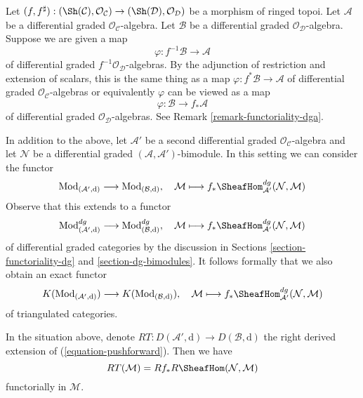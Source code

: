 \medskip\noindent
Let $(f, f^\sharp) : (\Sh(\mathcal{C}), \mathcal{O}_\mathcal{C})
\to (\Sh(\mathcal{D}), \mathcal{O}_\mathcal{D})$
be a morphism of ringed topoi. Let $\mathcal{A}$ be a differential
graded $\mathcal{O}_\mathcal{C}$-algebra. Let $\mathcal{B}$ be a
differential graded $\mathcal{O}_\mathcal{D}$-algebra.
Suppose we are given a map
$$
\varphi : f^{-1}\mathcal{B} \to \mathcal{A}
$$
of differential graded $f^{-1}\mathcal{O}_\mathcal{D}$-algebras.
By the adjunction of restriction and extension of scalars, this
is the same thing as a map $\varphi : f^*\mathcal{B} \to \mathcal{A}$
of differential graded $\mathcal{O}_\mathcal{C}$-algebras or equivalently
$\varphi$ can be viewed as a map
$$
\varphi : \mathcal{B} \to f_*\mathcal{A}
$$
of differential graded $\mathcal{O}_\mathcal{D}$-algebras.
See Remark \ref{remark-functoriality-dga}.

\medskip\noindent
In addition to the above, let $\mathcal{A}'$ be a second differential
graded $\mathcal{O}_\mathcal{C}$-algebra and let $\mathcal{N}$
be a differential graded $(\mathcal{A}, \mathcal{A}')$-bimodule.
In this setting we can consider the functor
$$
\text{Mod}_{(\mathcal{A}', \text{d})}
\longrightarrow
\text{Mod}_{(\mathcal{B}, \text{d})},\quad
\mathcal{M} \longmapsto
f_*\SheafHom^{dg}_{\mathcal{A}'}(\mathcal{N}, \mathcal{M})
$$
Observe that this extends to a functor
$$
\text{Mod}^{dg}_{(\mathcal{A}', \text{d})}
\longrightarrow
\text{Mod}^{dg}_{(\mathcal{B}, \text{d})},\quad
\mathcal{M} \longmapsto
f_*\SheafHom^{dg}_{\mathcal{A}'}(\mathcal{N}, \mathcal{M})
$$
of differential graded categories by the discussion in
Sections \ref{section-functoriality-dg} and \ref{section-dg-bimodules}.
It follows formally that we also obtain an exact functor
\begin{equation}
\label{equation-pushforward}
K(\text{Mod}_{(\mathcal{A}', \text{d})})
\longrightarrow
K(\text{Mod}_{(\mathcal{B}, \text{d})}),\quad
\mathcal{M} \longmapsto
f_*\SheafHom^{dg}_{\mathcal{A}'}(\mathcal{N}, \mathcal{M})
\end{equation}
of triangulated categories.

\begin{lemma}
\label{lemma-compose-pushforward-hom}
In the situation above, denote $RT : D(\mathcal{A}', \text{d}) \to
D(\mathcal{B}, \text{d})$ the right derived extension of
(\ref{equation-pushforward}). Then we have
$$
RT(\mathcal{M}) = Rf_* R\SheafHom(\mathcal{N}, \mathcal{M})
$$
functorially in $\mathcal{M}$.
\end{lemma}

